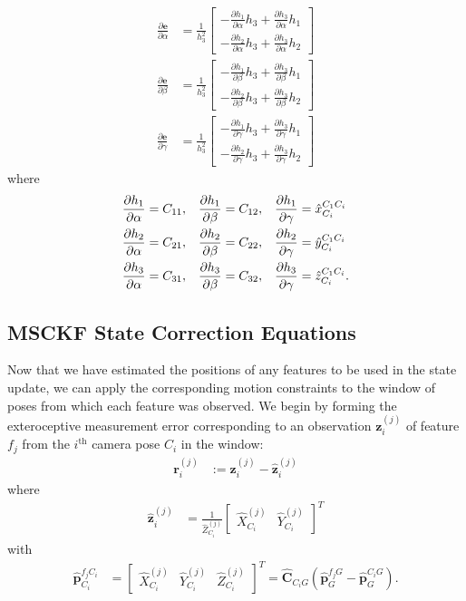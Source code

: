 \documentclass[letterpaper, 10 pt, conference]{ieeeconf}  %
\def\Vec#1{\mathbf{#1}}
\newcommand{\bbm}{\begin{bmatrix}}
\newcommand{\ebm}{\end{bmatrix}}
\begin{document}
\begin{align}
\frac{\partial \Vec e}{\partial \alpha} &= 
    \frac{1}{h_3^2} \bbm -\frac{\partial h_1}{\partial \alpha} h_3 + \frac{\partial h_3}{\partial \alpha} h_1 \\[0.5em]
                        -\frac{\partial h_2}{\partial \alpha} h_3 + \frac{\partial h_3}{\partial \alpha} h_2 \ebm
\\[0.5em]
\frac{\partial \Vec e}{\partial \beta} &= 
    \frac{1}{h_3^2} \bbm -\frac{\partial h_1}{\partial \beta} h_3 + \frac{\partial h_3}{\partial \beta} h_1 \\[0.5em] 
                        -\frac{\partial h_2}{\partial \beta} h_3 + \frac{\partial h_3}{\partial \beta} h_2 \ebm
\\[0.5em]
\frac{\partial \Vec e}{\partial \gamma} &= 
    \frac{1}{h_3^2} \bbm -\frac{\partial h_1}{\partial \gamma} h_3 + \frac{\partial h_3}{\partial \gamma} h_1 \\[0.5em] 
                        -\frac{\partial h_2}{\partial \gamma} h_3 + \frac{\partial h_3}{\partial \gamma} h_2 \ebm
\end{align}
where
\begin{align}
\frac{\partial h_1}{\partial \alpha} &= C_{11}, & \frac{\partial h_1}{\partial \beta} &= C_{12}, & \frac{\partial h_1}{\partial \gamma} &= \hat{x}_{C_i}^{C_1 C_i} \notag \\
\frac{\partial h_2}{\partial \alpha} &= C_{21}, & \frac{\partial h_2}{\partial \beta} &= C_{22}, & \frac{\partial h_2}{\partial \gamma} &= \hat{y}_{C_i}^{C_1 C_i} \\
\frac{\partial h_3}{\partial \alpha} &= C_{31}, & \frac{\partial h_3}{\partial \beta} &= C_{32}, & \frac{\partial h_3}{\partial \gamma} &= \hat{z}_{C_i}^{C_1 C_i} \notag .
\end{align}

\subsection{MSCKF State Correction Equations}
Now that we have estimated the positions of any features to be used in the state update, we can apply the corresponding motion constraints to the window of poses from which each feature was observed.
We begin by forming the exteroceptive measurement error corresponding to an observation $\Vec{z}_i^{(j)}$ of feature $f_j$ from the $i^\text{th}$ camera pose $C_i$ in the window:
\begin{align} \label{eq:residual_def}
    \Vec{r}_i^{(j)} &:= \Vec{z}_i^{(j)} - \hat{\Vec{z}}_i^{(j)}
\end{align}
where
\begin{align}
    \hat{\Vec{z}}_i^{(j)} &= \frac{1}{\hat{Z}^{(j)}_{C_i}} \bbm \hat{X}^{(j)}_{C_i} & \hat{Y}^{(j)}_{C_i} \ebm ^T
\end{align}
with 
\begin{align}
    \hat{\Vec{p}}_{C_i}^{f_j C_i} &= \bbm \hat{X}^{(j)}_{C_i} & \hat{Y}^{(j)}_{C_i} & \hat{Z}^{(j)}_{C_i} \ebm ^T = \hat{\Vec{C}}_{C_i G} \left( \hat{\Vec{p}}_G^{f_j G} - \hat{\Vec{p}}_G^{C_i G} \right).
\end{align}
\end{document}
